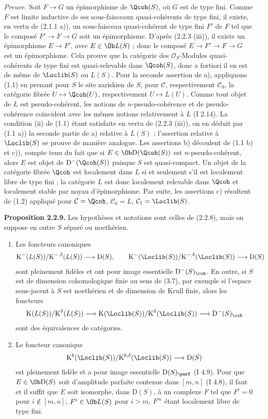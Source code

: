 \documentclass[11pt]{article}
\begin{document}
\emph{Preuve.} Soit $F\to G$ un épimorphisme de $\Qcoh(S)$, où $G$ est de type fini. Comme $F$ est limite inductive de ses sous-faisceaux quasi-cohérents de type fini, il existe, en vertu de (2.1.1 a)), un sous-faisceau quasi-cohérent de type fini $F'$ de $F$ tel que le composé $F'\to F\to G$ soit un épimorphisme. D'après (2.2.3 (iii)), il existe un épimorphisme $E\to F'$, avec $E\in\Ob L(S)$ ; donc le composé $E\to F'\to F\to G$ est un épimorphisme. Cela prouve que la catégorie des $\mathcal O_S$-Modules quasi-cohérents de type fini est quasi-relevable dans $\Qcoh(S)$, donc a fortiori il en est de même de $\Loclib(S)$ ou $L(S)$. Pour la seconde assertion de a), appliquons (1.1) en prenant pour $S$ le site zariskien de $S$, pour $\mathcal C$, respectivement $\mathcal C_0$, la catégorie fibrée $U\mapsto\Qcoh(U)$, respectivement $U\mapsto L(U)$. Comme tout objet de $L$ est pseudo-cohérent, les notions de $n$-pseudo-cohérence et de pseudo-cohérence coïncident avec les mêmes notions relativement à $L$ (I 2.14). La condition (ii) de (1.1) étant satisfaite en vertu de (2.2.3 (iii)), on en déduit par (1.1 a)) la seconde partie de a) relative à $L(S)$ ; l'assertion relative à $\Loclib(S)$ se prouve de manière analogue. Les assertions b) découlent de (1.1 b) et c)), compte tenu du fait que si $E\in\Ob\mathrm D(\Qcoh(S))$ est $n$-pseudo-cohérent, alors $E$ est objet de $\mathrm D^{-}(\Qcoh(S))$ puisque $S$ est quasi-compact. Un objet de la catégorie fibrée $\Qcoh$ est localement dans $L$ si et seulement s'il est localement libre de type fini ; la catégorie $L$ est donc localement relevable dans $\Qcoh$ et localement stable par noyau d'épimorphisme. Par suite, les assertions c) résultent de (1.2) appliqué pour $\mathcal C=\Qcoh$, $\mathcal C_0=L$, $\mathcal C_1=\Loclib(S)$.

\textbf{Proposition 2.2.9.} Les hypothèses et notations sont celles de (2.2.8), mais on suppose en outre $S$ séparé ou noethérien.
\begin{enumerate}[label=\alph*)]
\item Les foncteurs canoniques
\[
\mathrm K^{-}(L(S))/\mathrm K^{-,\delta}(L(S))\longrightarrow\mathrm D(S),
\qquad
\mathrm K^{-}(\Loclib(S))/\mathrm K^{-,\delta}(\Loclib(S))\longrightarrow\mathrm D(S)
\]
sont pleinement fidèles et ont pour image essentielle $\mathrm D^{-}(S)_{\coh}$. En outre, si $S$ est de dimension cohomologique finie au sens de (3.7), par exemple si l'espace sous-jacent à $S$ est noethérien et de dimension de Krull finie, alors les foncteurs
\[
\mathrm K(L(S))/\mathrm K^{\delta}(L(S))\longrightarrow
\mathrm K(\Loclib(S))/\mathrm K^{\delta}(\Loclib(S))\longrightarrow
\mathrm D^{-}(S)_{\coh}
\]
sont des équivalences de catégories.
\item Le foncteur canonique
\[
\mathrm K^b(\Loclib(S))/\mathrm K^{b,\delta}(\Loclib(S))\longrightarrow\mathrm D(S)
\]
est pleinement fidèle et a pour image essentielle $\mathrm D(S)_{\parf}$ (I 4.9). Pour que $E\in\Ob\mathrm D(S)$ soit d'amplitude parfaite contenue dans $[m,n]$ (I 4.8), il faut et il suffit que $E$ soit isomorphe, dans $\mathrm D(S)$, à un complexe $F$ tel que $F^i=0$ pour $i\notin[m,n]$, $F^i\in\Ob L(S)$ pour $i>m$, $F^m$ étant localement libre de type fini.
\end{enumerate}
\end{document}
